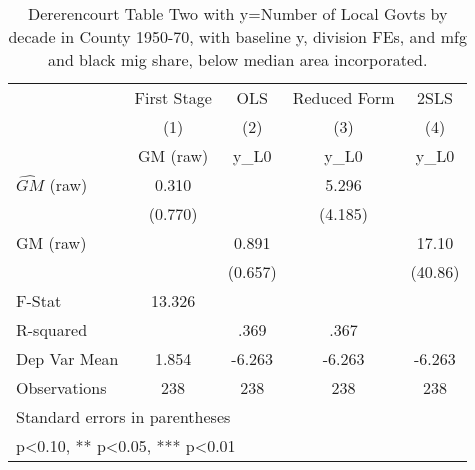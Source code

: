 \begin{table}[htbp]\centering
\def\sym#1{\ifmmode^{#1}\else\(^{#1}\)\fi}
\caption{Dererencourt Table Two with y=Number of Local Govts by decade in County 1950-70, with baseline y, division FEs, and mfg and black mig share, below median area incorporated.}
\begin{tabular}{l*{4}{c}}
\toprule
                    & First Stage   &         OLS   &Reduced Form   &        2SLS   \\
                    &\multicolumn{1}{c}{(1)}&\multicolumn{1}{c}{(2)}&\multicolumn{1}{c}{(3)}&\multicolumn{1}{c}{(4)}\\
                    &\multicolumn{1}{c}{GM  (raw)}&\multicolumn{1}{c}{y\_L0}&\multicolumn{1}{c}{y\_L0}&\multicolumn{1}{c}{y\_L0}\\
\midrule
$\hat{GM}$ (raw)    &       0.310   &               &       5.296   &               \\
                    &     (0.770)   &               &     (4.185)   &               \\
\addlinespace
GM  (raw)           &               &       0.891   &               &       17.10   \\
                    &               &     (0.657)   &               &     (40.86)   \\
\midrule
F-Stat              &      13.326   &               &               &               \\
R-squared           &               &        .369   &        .367   &               \\
Dep Var Mean        &       1.854   &      -6.263   &      -6.263   &      -6.263   \\
Observations        &         238   &         238   &         238   &         238   \\
\bottomrule
\multicolumn{5}{l}{\footnotesize Standard errors in parentheses}\\
\multicolumn{5}{l}{\footnotesize * p<0.10, ** p<0.05, *** p<0.01}\\
\end{tabular}
\end{table}

